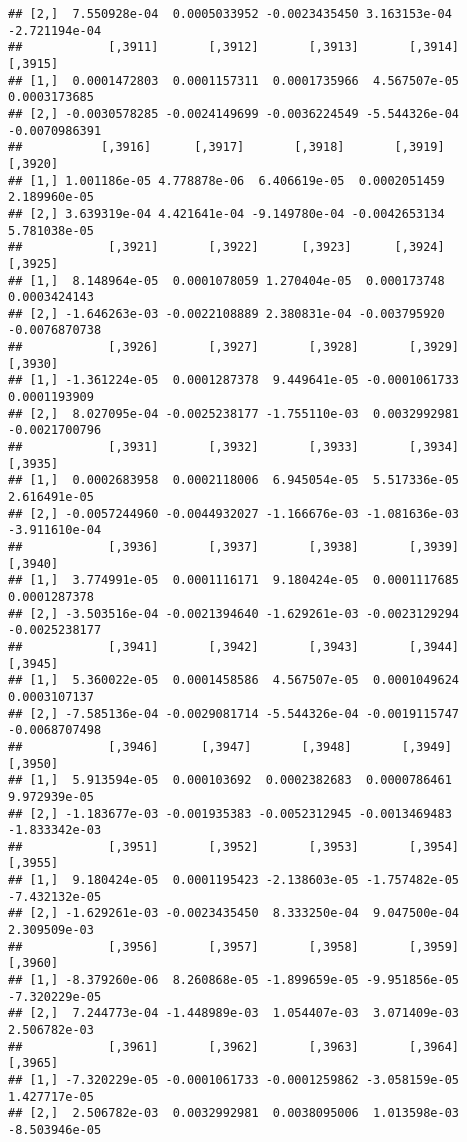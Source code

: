 \documentclass[
]{article}
\begin{document}
\begin{verbatim}
## [2,]  7.550928e-04  0.0005033952 -0.0023435450 3.163153e-04 -2.721194e-04
##            [,3911]       [,3912]       [,3913]       [,3914]       [,3915]
## [1,]  0.0001472803  0.0001157311  0.0001735966  4.567507e-05  0.0003173685
## [2,] -0.0030578285 -0.0024149699 -0.0036224549 -5.544326e-04 -0.0070986391
##           [,3916]      [,3917]       [,3918]       [,3919]      [,3920]
## [1,] 1.001186e-05 4.778878e-06  6.406619e-05  0.0002051459 2.189960e-05
## [2,] 3.639319e-04 4.421641e-04 -9.149780e-04 -0.0042653134 5.781038e-05
##            [,3921]       [,3922]      [,3923]      [,3924]       [,3925]
## [1,]  8.148964e-05  0.0001078059 1.270404e-05  0.000173748  0.0003424143
## [2,] -1.646263e-03 -0.0022108889 2.380831e-04 -0.003795920 -0.0076870738
##            [,3926]       [,3927]       [,3928]       [,3929]       [,3930]
## [1,] -1.361224e-05  0.0001287378  9.449641e-05 -0.0001061733  0.0001193909
## [2,]  8.027095e-04 -0.0025238177 -1.755110e-03  0.0032992981 -0.0021700796
##            [,3931]       [,3932]       [,3933]       [,3934]       [,3935]
## [1,]  0.0002683958  0.0002118006  6.945054e-05  5.517336e-05  2.616491e-05
## [2,] -0.0057244960 -0.0044932027 -1.166676e-03 -1.081636e-03 -3.911610e-04
##            [,3936]       [,3937]       [,3938]       [,3939]       [,3940]
## [1,]  3.774991e-05  0.0001116171  9.180424e-05  0.0001117685  0.0001287378
## [2,] -3.503516e-04 -0.0021394640 -1.629261e-03 -0.0023129294 -0.0025238177
##            [,3941]       [,3942]       [,3943]       [,3944]       [,3945]
## [1,]  5.360022e-05  0.0001458586  4.567507e-05  0.0001049624  0.0003107137
## [2,] -7.585136e-04 -0.0029081714 -5.544326e-04 -0.0019115747 -0.0068707498
##            [,3946]      [,3947]       [,3948]       [,3949]       [,3950]
## [1,]  5.913594e-05  0.000103692  0.0002382683  0.0000786461  9.972939e-05
## [2,] -1.183677e-03 -0.001935383 -0.0052312945 -0.0013469483 -1.833342e-03
##            [,3951]       [,3952]       [,3953]       [,3954]       [,3955]
## [1,]  9.180424e-05  0.0001195423 -2.138603e-05 -1.757482e-05 -7.432132e-05
## [2,] -1.629261e-03 -0.0023435450  8.333250e-04  9.047500e-04  2.309509e-03
##            [,3956]       [,3957]       [,3958]       [,3959]       [,3960]
## [1,] -8.379260e-06  8.260868e-05 -1.899659e-05 -9.951856e-05 -7.320229e-05
## [2,]  7.244773e-04 -1.448989e-03  1.054407e-03  3.071409e-03  2.506782e-03
##            [,3961]       [,3962]       [,3963]       [,3964]       [,3965]
## [1,] -7.320229e-05 -0.0001061733 -0.0001259862 -3.058159e-05  1.427717e-05
## [2,]  2.506782e-03  0.0032992981  0.0038095006  1.013598e-03 -8.503946e-05

\end{verbatim}
\end{document}
